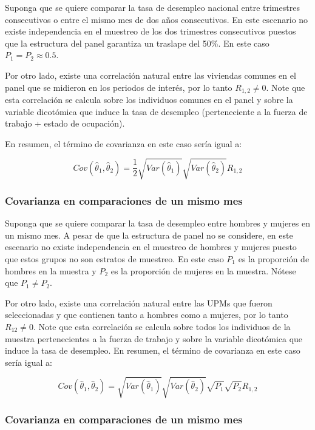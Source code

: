 \documentclass[
  12pt,
  spanish,
]{book}
\begin{document}
Suponga que se quiere comparar la tasa de desempleo nacional entre trimestres consecutivos o entre el mismo mes de dos años consecutivos. En este escenario no existe independencia en el muestreo de los dos trimestres consecutivos puestos que la estructura del panel garantiza un traslape del 50\%. En este caso \(P_1 = P_2 \approx 0.5\).

Por otro lado, existe una correlación natural entre las viviendas comunes en el panel que se midieron en los periodos de interés, por lo tanto \(R_{1,2} \neq 0\). Note que esta correlación se calcula sobre los individuos comunes en el panel y sobre la variable dicotómica que induce la tasa de desempleo (perteneciente a la fuerza de trabajo + estado de ocupación).

En resumen, el término de covarianza en este caso sería igual a:

\[
Cov(\hat{\theta}_1, \hat{\theta}_2) = \frac{1}{2}\sqrt{Var(\hat{\theta}_1)}\sqrt{Var(\hat{\theta}_2)}R_{1,2}
\]

\hypertarget{covarianza-en-comparaciones-de-un-mismo-mes}{%
\subsubsection*{Covarianza en comparaciones de un mismo mes}\label{covarianza-en-comparaciones-de-un-mismo-mes}}

Suponga que se quiere comparar la tasa de desempleo entre hombres y mujeres en un mismo mes. A pesar de que la estructura de panel no se considere, en este escenario no existe independencia en el muestreo de hombres y mujeres puesto que estos grupos no son estratos de muestreo. En este caso \(P_1\) es la proporción de hombres en la muestra y \(P_2\) es la proporción de mujeres en la muestra. Nótese que \(P_1 \neq P_2\).

Por otro lado, existe una correlación natural entre las UPMs que fueron seleccionadas y que contienen tanto a hombres como a mujeres, por lo tanto \(R_{12} \neq 0\). Note que esta correlación se calcula sobre todos los individuos de la muestra pertenecientes a la fuerza de trabajo y sobre la variable dicotómica que induce la tasa de desempleo. En resumen, el término de covarianza en este caso sería igual a:

\[
Cov(\hat{\theta}_1, \hat{\theta}_2) = \sqrt{Var(\hat{\theta}_1)}\sqrt{Var(\hat{\theta}_2)}\sqrt{P_1}\sqrt{P_2}R_{1,2}
\]

\hypertarget{covarianza-en-comparaciones-de-un-mismo-mes-1}{%
\subsubsection*{Covarianza en comparaciones de un mismo mes}\label{covarianza-en-comparaciones-de-un-mismo-mes-1}}
\end{document}
